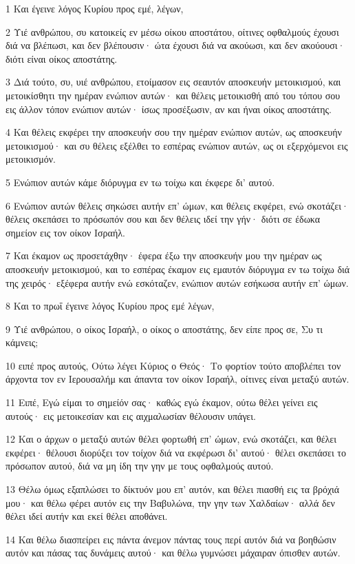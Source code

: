 \par 1 Και έγεινε λόγος Κυρίου προς εμέ, λέγων,
\par 2 Υιέ ανθρώπου, συ κατοικείς εν μέσω οίκου αποστάτου, οίτινες οφθαλμούς έχουσι διά να βλέπωσι, και δεν βλέπουσιν· ώτα έχουσι διά να ακούωσι, και δεν ακούουσι· διότι είναι οίκος αποστάτης.
\par 3 Διά τούτο, συ, υιέ ανθρώπου, ετοίμασον εις σεαυτόν αποσκευήν μετοικισμού, και μετοικίσθητι την ημέραν ενώπιον αυτών· και θέλεις μετοικισθή από του τόπου σου εις άλλον τόπον ενώπιον αυτών· ίσως προσέξωσιν, αν και ήναι οίκος αποστάτης.
\par 4 Και θέλεις εκφέρει την αποσκευήν σου την ημέραν ενώπιον αυτών, ως αποσκευήν μετοικισμού· και συ θέλεις εξέλθει το εσπέρας ενώπιον αυτών, ως οι εξερχόμενοι εις μετοικισμόν.
\par 5 Ενώπιον αυτών κάμε διόρυγμα εν τω τοίχω και έκφερε δι' αυτού.
\par 6 Ενώπιον αυτών θέλεις σηκώσει αυτήν επ' ώμων, και θέλεις εκφέρει, ενώ σκοτάζει· θέλεις σκεπάσει το πρόσωπόν σου και δεν θέλεις ιδεί την γήν· διότι σε έδωκα σημείον εις τον οίκον Ισραήλ.
\par 7 Και έκαμον ως προσετάχθην· έφερα έξω την αποσκευήν μου την ημέραν ως αποσκευήν μετοικισμού, και το εσπέρας έκαμον εις εμαυτόν διόρυγμα εν τω τοίχω διά της χειρός· εξέφερα αυτήν ενώ εσκόταζεν, ενώπιον αυτών εσήκωσα αυτήν επ' ώμων.
\par 8 Και το πρωΐ έγεινε λόγος Κυρίου προς εμέ λέγων,
\par 9 Υιέ ανθρώπου, ο οίκος Ισραήλ, ο οίκος ο αποστάτης, δεν είπε προς σε, Συ τι κάμνεις;
\par 10 ειπέ προς αυτούς, Ούτω λέγει Κύριος ο Θεός· Το φορτίον τούτο αποβλέπει τον άρχοντα τον εν Ιερουσαλήμ και άπαντα τον οίκον Ισραήλ, οίτινες είναι μεταξύ αυτών.
\par 11 Ειπέ, Εγώ είμαι το σημείόν σας· καθώς εγώ έκαμον, ούτω θέλει γείνει εις αυτούς· εις μετοικεσίαν και εις αιχμαλωσίαν θέλουσιν υπάγει.
\par 12 Και ο άρχων ο μεταξύ αυτών θέλει φορτωθή επ' ώμων, ενώ σκοτάζει, και θέλει εκφέρει· θέλουσι διορύξει τον τοίχον διά να εκφέρωσι δι' αυτού· θέλει σκεπάσει το πρόσωπον αυτού, διά να μη ίδη την γην με τους οφθαλμούς αυτού.
\par 13 Θέλω όμως εξαπλώσει το δίκτυόν μου επ' αυτόν, και θέλει πιασθή εις τα βρόχιά μου· και θέλω φέρει αυτόν εις την Βαβυλώνα, την γην των Χαλδαίων· αλλά δεν θέλει ιδεί αυτήν και εκεί θέλει αποθάνει.
\par 14 Και θέλω διασπείρει εις πάντα άνεμον πάντας τους περί αυτόν διά να βοηθώσιν αυτόν και πάσας τας δυνάμεις αυτού· και θέλω γυμνώσει μάχαιραν όπισθεν αυτών.
